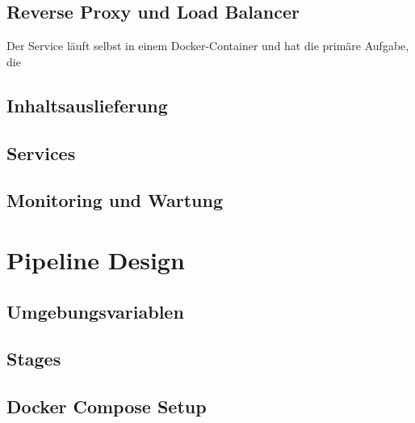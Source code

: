
\subsection{Reverse Proxy und Load Balancer}
\label{subsec:reverseproxyundloadbalancer}

Der Service läuft selbst in einem
Docker-Container und hat die primäre Aufgabe, die 

\subsection{Inhaltsauslieferung}
\label{subsec:inhaltsauslieferung}


\subsection{Services}
\label{subsec:services}

\subsection{Monitoring und Wartung}
\label{subsec:monitoringundwartung}

\section{Pipeline Design}
\label{sec:pipelinedesign}

\subsection{Umgebungsvariablen}
\label{subsec:umgebungsvariablen}

\subsection{Stages}
\label{subsec:stages}


\subsection{Docker Compose Setup}
\label{subsec:dockercomposesetup}

